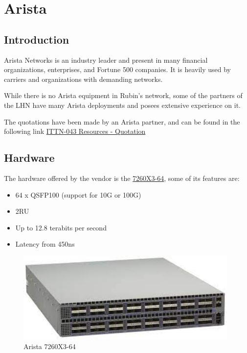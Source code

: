 \section{Arista}

\subsection{Introduction}

Arista Networks is an industry leader and present in many financial organizations, enterprises, and Fortune 500 companies. It is heavily used by carriers and organizations with demanding networks. 

While there is no Arista equipment in Rubin's network, some of the partners of the LHN have many Arista deployments and posees extensive experience on it. 

The quotations have been made by an Arista partner, and can be found in the following link \href{https://confluence.lsstcorp.org/display/IT/ITTN-043+-+Rubin+Network+Re-Engineering}{ITTN-043 Resources - Quotation}

\subsection{Hardware}

The hardware offered by the vendor is the \href{https://www.arista.com/assets/data/pdf/Datasheets/7260X3_Datasheet.pdf}{7260X3-64}, some of its features are:
\begin{itemize}
    \item 64 x QSFP100 (support for 10G or 100G)
    \item 2RU
    \item Up to 12.8 terabits per second
    \item Latency from 450ns
\end{itemize}

\begin{figure}
    \includegraphics[width=11cm]{images/arista_7260X3-64.jpg}
    \centering
    \caption{Arista 7260X3-64}
  \end{figure}

